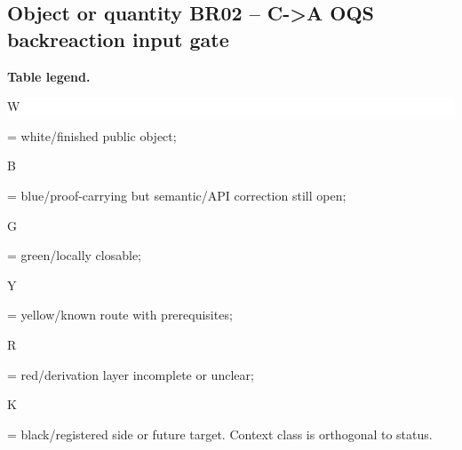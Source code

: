 \subsection*{Object or quantity BR02 -- C->A OQS backreaction input gate}
\hypertarget{objproof:BR02}{}
\par\smallskip\noindent\begin{minipage}{0.99\linewidth}\footnotesize\raggedright\textbf{Table legend.} \colorbox{white}{\strut W} = white/finished public object; \colorbox{cyan!20}{\strut B} = blue/proof-carrying but semantic/API correction still open; \colorbox{green!18}{\strut G} = green/locally closable; \colorbox{yellow!25}{\strut Y} = yellow/known route with prerequisites; \colorbox{red!20}{\strut R} = red/derivation layer incomplete or unclear; \colorbox{black!18}{\strut K} = black/registered side or future target. Context class is orthogonal to status.\end{minipage}\par\vspace{0.25em}
